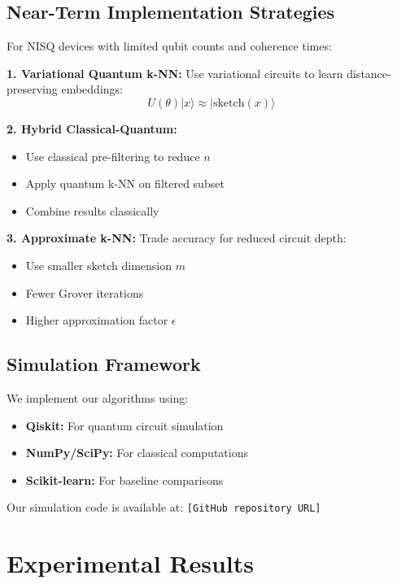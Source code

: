\documentclass[11pt]{article}
\begin{document}
\subsection{Near-Term Implementation Strategies}

For NISQ devices with limited qubit counts and coherence times:

\textbf{1. Variational Quantum k-NN:}
Use variational circuits to learn distance-preserving embeddings:
\begin{equation}
U(\theta)|x\rangle \approx |\text{sketch}(x)\rangle
\end{equation}

\textbf{2. Hybrid Classical-Quantum:}
\begin{itemize}
    \item Use classical pre-filtering to reduce $n$
    \item Apply quantum k-NN on filtered subset
    \item Combine results classically
\end{itemize}

\textbf{3. Approximate k-NN:}
Trade accuracy for reduced circuit depth:
\begin{itemize}
    \item Use smaller sketch dimension $m$
    \item Fewer Grover iterations
    \item Higher approximation factor $\epsilon$
\end{itemize}

\subsection{Simulation Framework}

We implement our algorithms using:
\begin{itemize}
    \item \textbf{Qiskit:} For quantum circuit simulation
    \item \textbf{NumPy/SciPy:} For classical computations
    \item \textbf{Scikit-learn:} For baseline comparisons
\end{itemize}

Our simulation code is available at: \texttt{[GitHub repository URL]}

\section{Experimental Results}
\label{sec:experiments}
\end{document}
